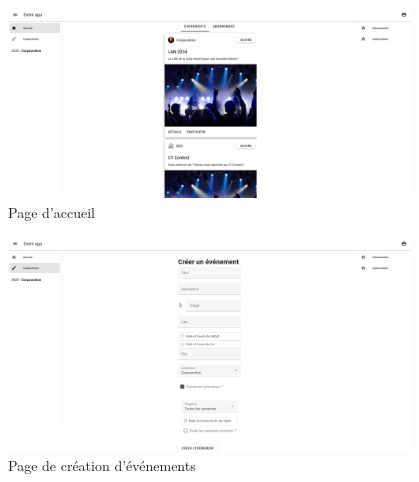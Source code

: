 \begin{figure}[!h]
	\centering
	\includegraphics[width=0.95\textwidth]{assets/homepage.png}
	\caption{Page d'accueil}
	\label{fig:homepage}
\end{figure}


\begin{figure}[!h]
	\centering
	\includegraphics[width=0.95\textwidth]{assets/createevent.png}
	\caption{Page de création d'événements}
	\label{fig:createevent}
\end{figure}